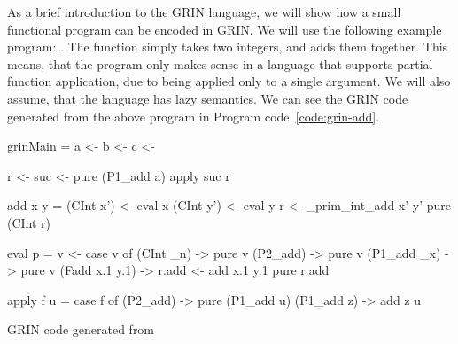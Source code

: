 \documentclass[main.tex]{subfiles}
\begin{document}
	As a brief introduction to the GRIN language, we will show how a small functional program can be encoded in GRIN. We will use the following example program: . The  function simply takes two integers, and adds them together. This means, that the program only makes sense in a language that supports partial function application, due to  being applied only to a single argument. We will also assume, that the language has lazy semantics. We can see the GRIN code generated from the above program in Program code~\ref{code:grin-add}.
	
	\hspace{-0.5cm}
	\begin{codeFloat}
		\begin{minipage}{0.48\textwidth}
			\begin{haskell}
	      grinMain =
	        a <- %
	        b <- %
	        c <- %
	        
	        r <- %
	        suc <- pure (P1_add a)
	        apply suc r
	
	      add x y =
	        (CInt x') <- eval x
	        (CInt y') <- eval y
	        r <- _prim_int_add x' y'
	        pure (CInt r)
			\end{haskell}
		\end{minipage}
		\hfill
		\begin{minipage}{0.50\textwidth}
			\begin{haskellNum}{12}
	     eval p =
	       v <- %
	       case v of
	         (CInt _n) -> pure v
	         (P2_add) -> pure v
	         (P1_add _x) -> pure v
	         (Fadd x.1 y.1) ->
	           r.add <- add x.1 y.1
	           pure r.add
	       
	     apply f u =
	       case f of
	         (P2_add) -> 
	           pure (P1_add u)
	         (P1_add z) -> add z u
			\end{haskellNum}
		\end{minipage}
		\caption{GRIN code generated from }
		\label{code:grin-add}
		
	\end{codeFloat}
		
\end{document}
